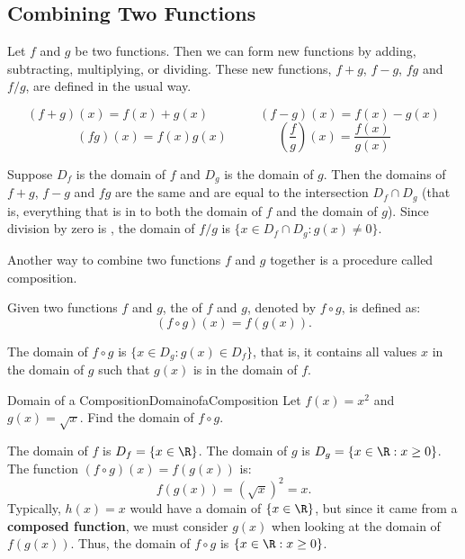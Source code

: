 \subsection{Combining Two Functions}
Let $f$ and $g$ be two functions.
Then we can form new functions by adding, subtracting, multiplying, or dividing.
These new functions, $f+g$, $f-g$, $fg$ and $f/g$, are defined in the usual way.

\begin{formulabox}
$$(f+g)(x)=f(x)+g(x)\qquad \qquad (f-g)(x)=f(x)-g(x)$$
$$(fg)(x)=f(x)g(x)\qquad \qquad \left(\frac{f}{g}\right)(x)=\frac{f(x)}{g(x)}$$
\end{formulabox}

Suppose $D_f$ is the domain of $f$ and $D_g$ is the domain of $g$.
Then the domains of $f+g$, $f-g$ and $fg$ are the same and are equal to the intersection $D_f\cap D_g$ (that is, everything that is in  to both the domain of $f$ and the domain of $g$).
Since division by zero is , the domain of $f/g$ is $\{x\in D_f\cap D_g:g(x)\neq 0\}$.

Another way to combine two functions $f$ and $g$ together is a procedure called composition.

\begin{formulabox}
Given two functions $f$ and $g$, the  of $f$ and $g$, denoted by $f\circ g$, is defined as:
$$(f\circ g)(x)=f(g(x)).$$
\end{formulabox}

The domain of $f\circ g$ is $\{x\in D_g:g(x)\in D_f\}$, that is, it contains all values $x$ in the domain of $g$ such that $g(x)$ is in the domain of $f$.

\begin{example}{Domain of a Composition}{DomainofaComposition}
Let $f(x)=x^2$ and $g(x)=\sqrt x$.
Find the domain of $f\circ g$.
\end{example}

\begin{solution}
The domain of $f$ is $D_f=\{x\in\R\}$. 
The domain of $g$ is $D_g=\{x\in\R:x\geq 0\}$.
The function $(f\circ g)(x)=f(g(x))$ is:
$$f(g(x))=\left(\sqrt x\right)^2=x.$$
Typically, $h(x)=x$ would have a domain of $\{x\in\R\}$, but since it came from a {\bf composed function}, we must consider $g(x)$ when looking at the domain of $f(g(x))$. 
Thus, the domain of $f\circ g$ is $\{x\in\R:x\geq 0\}$.
\end{solution}

